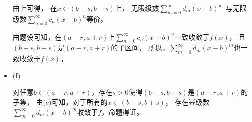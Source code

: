 \documentclass{article}
\begin{document}
\begin{itemize}
        由上可得，
        在$x \in (b - s, b + s)$上，
        无限级数$\sum \limits_{m = 0}^\infty d_m (x - b)^m$
        与无限级数$\sum \limits_{n = 0}^\infty c_n (x - b)^n$等价。

        由题设可知，在$(a - r, a + r)$上$\sum \limits_{n = 0}^\infty c_n (x - b)^n$一致收敛于$f(x)$，
        且$(b - s, b + s)$是$(a - r, a + r)$的子区间，
        所以，$\sum \limits_{m = 0}^\infty d_m (x - b)^m$也一致收敛于$f(x)$。



  \item (f)

        对任意$b \in (a -r, a + r)$，存在$s > 0$使得$(b - s, b + s)$是$(a -r, a + r)$的子集，
        由(e)可知，对于所有的$x \in (b - s, b + s)$，
        存在幂级数$\sum\limits_{m = 0}^\infty d_m (x - b)^m$收敛于$f$，命题得证。

\end{itemize}
\end{document}
